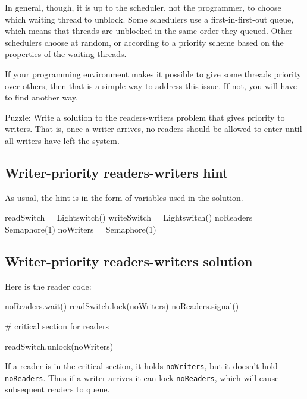 \documentclass{book}
\begin{document}
In general, though, it is up to the scheduler, not the programmer,
to choose which waiting thread to unblock.
Some schedulers use a first-in-first-out queue, which means
that threads are unblocked in the same order they queued.
Other schedulers choose at random, or according to
a priority scheme based on the properties of the waiting
threads.

If your programming environment makes it possible to give
some threads priority over others, then that is a simple way
to address this issue.  If not, you will have to find another
way.

Puzzle: Write a solution to the readers-writers problem that gives
priority to writers.  That is, once a writer arrives, no readers
should be allowed to enter until all writers have left the system.



{\raggedright\subsection{Writer-priority readers-writers hint}}

As usual, the hint is in the form of variables
used in the solution.

\begin{unbreakable}[title={Writer-priority readers-writers initialization}]{}
readSwitch = Lightswitch()
writeSwitch = Lightswitch()
noReaders = Semaphore(1)
noWriters = Semaphore(1)
\end{unbreakable}



\subsection{Writer-priority readers-writers solution}

Here is the reader code:

\begin{unbreakable}[title={Writer-priority reader solution}]{}
noReaders.wait()
    readSwitch.lock(noWriters)
noReaders.signal()

    # critical section for readers

readSwitch.unlock(noWriters)
\end{unbreakable}

If a reader is in the critical section, it holds
    {\tt noWriters}, but it doesn't hold {\tt noReaders}.
Thus if a writer arrives it can lock {\tt noReaders},
which will cause subsequent readers to queue.
\end{document}
